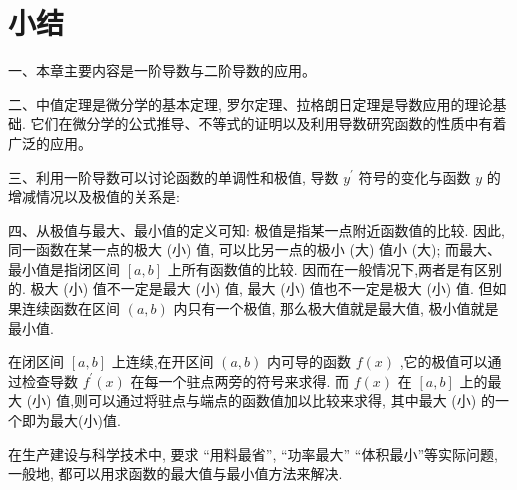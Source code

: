 \documentclass[lang=cn,newtx,12pt,scheme=chinese]{elegantbook}
\begin{document}
\chapter*{小结}

一、本章主要内容是一阶导数与二阶导数的应用。

二、中值定理是微分学的基本定理, 罗尔定理、拉格朗日定理是导数应用的理论基础. 它们在微分学的公式推导、不等式的证明以及利用导数研究函数的性质中有着广泛的应用。

三、利用一阶导数可以讨论函数的单调性和极值, 导数 \({y}^{\prime }\) 符号的变化与函数 \(y\) 的增减情况以及极值的关系是:

\begin{center}
\end{center}

四、从极值与最大、最小值的定义可知: 极值是指某一点附近函数值的比较. 因此, 同一函数在某一点的极大 (小) 值, 可以比另一点的极小 (大) 值小 (大); 而最大、最小值是指闭区间 \(\left\lbrack {a,b}\right\rbrack\) 上所有函数值的比较. 因而在一般情况下,两者是有区别的. 极大 (小) 值不一定是最大 (小) 值, 最大 (小) 值也不一定是极大 (小) 值. 但如果连续函数在区间 \(\left( {a,b}\right)\) 内只有一个极值, 那么极大值就是最大值, 极小值就是最小值.

在闭区间 \(\left\lbrack {a,b}\right\rbrack\) 上连续,在开区间 \(\left( {a,b}\right)\) 内可导的函数 \(f\left( x\right)\) ,它的极值可以通过检查导数 \({f}^{\prime }\left( x\right)\) 在每一个驻点两旁的符号来求得. 而 \(f\left( x\right)\) 在 \(\left\lbrack {a,b}\right\rbrack\) 上的最大 (小) 值,则可以通过将驻点与端点的函数值加以比较来求得, 其中最大 (小) 的一个即为最大(小)值.

在生产建设与科学技术中, 要求 “用料最省”, “功率最大” “体积最小”等实际问题, 一般地, 都可以用求函数的最大值与最小值方法来解决.
\end{document}
